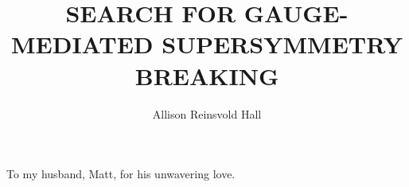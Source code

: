 \documentclass[final,numrefs,compress]{nddiss2e}
\begin{document}
\frontmatter         %

\title{ SEARCH FOR GAUGE-MEDIATED SUPERSYMMETRY BREAKING}            %
\author{Allison Reinsvold Hall }           %

\maketitle           %



  \begin{dedication}
 To my husband, Matt, for his unwavering love.
  \end{dedication}
 
\setcounter{tocdepth}{1}
\tableofcontents
\listoffigures
\listoftables
\end{document}
